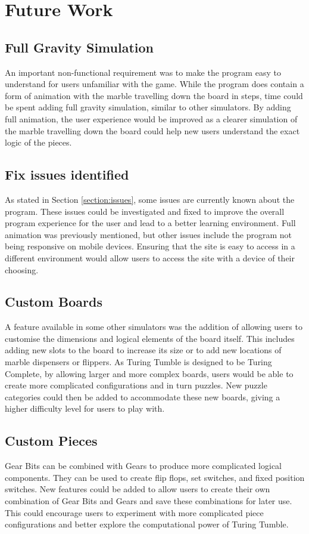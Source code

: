 \documentclass{l4proj}
\begin{document}
\section{Future Work}
\label{section:future-work}
\subsection{Full Gravity Simulation}
An important non-functional requirement was to make the program easy to understand for users unfamiliar with the game. While the program does contain a form of animation with the marble travelling down the board in steps, time could be spent adding full gravity simulation, similar to other simulators. By adding full animation, the user experience would be improved as a clearer simulation of the marble travelling down the board could help new users understand the exact logic of the pieces.

\subsection{Fix issues identified}
As stated in Section \ref{section:issues}, some issues are currently known about the program. These issues could be investigated and fixed to improve the overall program experience for the user and lead to a better learning environment. Full animation was previously mentioned, but other issues include the program not being responsive on mobile devices. Ensuring that the site is easy to access in a different environment would allow users to access the site with a device of their choosing.

\subsection{Custom Boards}
A feature available in some other simulators was the addition of allowing users to customise the dimensions and logical elements of the board itself. This includes adding new slots to the board to increase its size or to add new locations of marble dispensers or flippers. As Turing Tumble is designed to be Turing Complete, by allowing larger and more complex boards, users would be able to create more complicated configurations and in turn puzzles. New puzzle categories could then be added to accommodate these new boards, giving a higher difficulty level for users to play with.  

\subsection{Custom Pieces}
Gear Bits can be combined with Gears to produce more complicated logical components. They can be used to create flip flops, set switches, and fixed position switches. New features could be added to allow users to create their own combination of Gear Bits and Gears and save these combinations for later use. This could encourage users to experiment with more complicated piece configurations and better explore the computational power of Turing Tumble.
\end{document}
